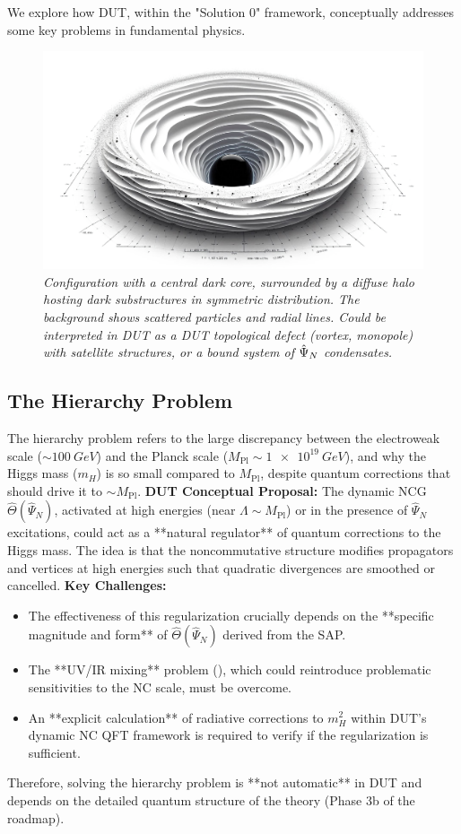 \documentclass[11pt, a4paper]{article}
\theoremstyle{remark}
\newcommand{\Op}[1]{\hat{#1}}
\newcommand{\Mpl}{M_{\mathrm{Pl}}}
\begin{document}
We explore how DUT, within the "Solution 0" framework, conceptually addresses some key problems in fundamental physics.

\begin{figure}[htbp]
    \centering
    \includegraphics[width=0.6\linewidth]{OIG27.ZNLJ.PNG}
    \caption{%
     \footnotesize\textit{Configuration with a central dark core, surrounded by a diffuse halo hosting dark substructures in symmetric distribution. The background shows scattered particles and radial lines. Could be interpreted in DUT as a DUT topological defect (vortex, monopole) with satellite structures, or a bound system of \(\protect\Op{\Psi}_N\) condensates.}
    }
    \label{fig:Figura9}
\end{figure}

\subsection{The Hierarchy Problem}
\label{sec:problema_jerarquia_final}
The hierarchy problem refers to the large discrepancy between the electroweak scale (\( \sim \SI{100}{GeV} \)) and the Planck scale (\( \Mpl \sim \SI{1e19}{GeV} \)), and why the Higgs mass (\( m_H \)) is so small compared to \( \Mpl \), despite quantum corrections that should drive it to \( \sim \Mpl \).
\textbf{DUT Conceptual Proposal:} The dynamic NCG \( \Op{\Theta}(\Op{\Psi}_N) \), activated at high energies (near \( \Lambda \sim \Mpl \)) or in the presence of \( \Op{\Psi}_N \) excitations, could act as a **natural regulator** of quantum corrections to the Higgs mass. The idea is that the noncommutative structure modifies propagators and vertices at high energies such that quadratic divergences are smoothed or cancelled.
\textbf{Key Challenges:}
\begin{itemize}
    \item The effectiveness of this regularization crucially depends on the **specific magnitude and form** of \( \Op{\Theta}(\Op{\Psi}_N) \) derived from the SAP.
    \item The **UV/IR mixing** problem (), which could reintroduce problematic sensitivities to the NC scale, must be overcome.
    \item An **explicit calculation** of radiative corrections to \( m_H^2 \) within DUT's dynamic NC QFT framework is required to verify if the regularization is sufficient.
\end{itemize}
Therefore, solving the hierarchy problem is **not automatic** in DUT and depends on the detailed quantum structure of the theory (Phase 3b of the roadmap).
\end{document}
